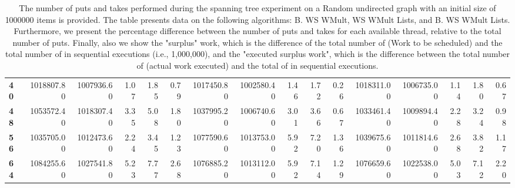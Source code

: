 \begin{table}[!ht]
{\begin{tabular}{lrrrrrrrrrrrrrrr}
\textbf{40} &  1018807.80 & 1007936.60 &           1.07 &        1.85 &                 0.79 &     1017450.80 & 1002580.40 &           1.46 &        1.72 &                 0.26 &        1018311.00 & 1006735.00 &           1.14 &        1.80 &                 0.67 \\
\textbf{48} &  1053572.40 & 1018307.40 &           3.35 &        5.08 &                 1.80 &     1037995.20 & 1006740.60 &           3.01 &        3.66 &                 0.67 &        1033461.40 & 1009894.40 &           2.28 &        3.24 &                 0.98 \\
\textbf{56} &  1035705.00 & 1012473.60 &           2.24 &        3.45 &                 1.23 &     1077590.60 & 1013753.00 &           5.92 &        7.20 &                 1.36 &        1039675.60 & 1011814.60 &           2.68 &        3.82 &                 1.17 \\
\textbf{64} &  1084255.60 & 1027541.80 &           5.23 &        7.77 &                 2.68 &     1076885.20 & 1013112.00 &           5.92 &        7.14 &                 1.29 &        1076659.60 & 1022538.00 &           5.03 &        7.12 &                 2.20 \\
\bottomrule
\end{tabular}}
\label{difference-Random_directed-1000000-B_WS_NC_MULT_OPT-WS_NC_MULT_LA_OPT-B_WS_NC_MULT_LA_OPT}
\caption{The number of puts and takes performed during the
    spanning tree experiment on a Random undirected graph with an initial size
    of 1000000 items is provided. The table presents data on the
    following algorithms: B. WS WMult, WS WMult Lists, and
    B. WS WMult Lists. Furthermore, we present the percentage difference
    between the number of puts and takes for each available thread,
    relative to the total number of puts. Finally, also we show the
    "surplus" work, which is the difference of the total number of
    \Puts (Work to be scheduled) and the total number of \Puts in
    sequential executions (i.e., 1,000,000), and the "executed surplus
    work", which is the difference between the total number of \Takes
    (actual work executed) and the total of \Takes in sequential
    executions.}
\end{table}
